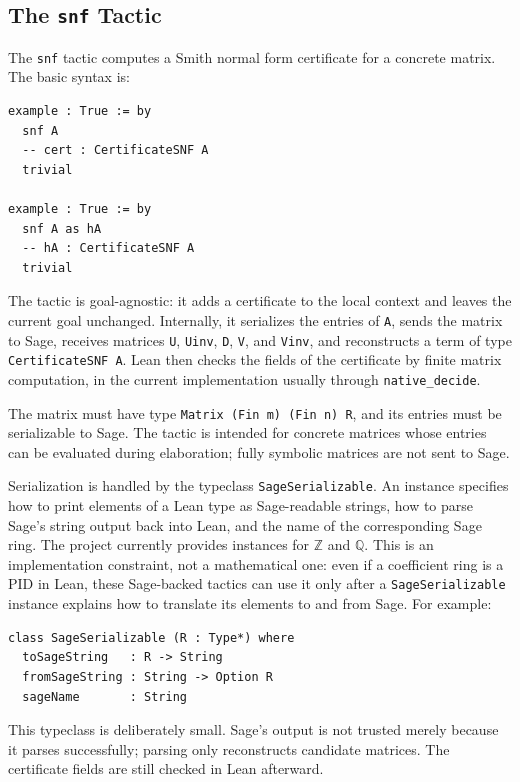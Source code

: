 \documentclass[11pt]{article}
\theoremstyle{plain}
\theoremstyle{definition}
\theoremstyle{remark}
\newcommand{\lean}[1]{\lstinline[language=lean]|#1|}
\begin{document}
\subsection{The \texttt{snf} Tactic}

The \lean{snf} tactic computes a Smith normal form certificate for a concrete
matrix. The basic syntax is:

\begin{lstlisting}[caption={Using the \texttt{snf} tactic.},label={lst:snf-tactic}]
example : True := by
  snf A
  -- cert : CertificateSNF A
  trivial

example : True := by
  snf A as hA
  -- hA : CertificateSNF A
  trivial
\end{lstlisting}

The tactic is goal-agnostic: it adds a certificate to the local context and
leaves the current goal unchanged. Internally, it serializes the entries of
\lean{A}, sends the matrix to Sage, receives matrices \lean{U}, \lean{Uinv},
\lean{D}, \lean{V}, and \lean{Vinv}, and reconstructs a term of type
\lean{CertificateSNF A}. Lean then checks the fields of the certificate by
finite matrix computation, in the current implementation usually through
\lean{native_decide}.

The matrix must have type \lean{Matrix (Fin m) (Fin n) R}, and its entries must
be serializable to Sage. The tactic is intended for concrete matrices whose
entries can be evaluated during elaboration; fully symbolic matrices are not
sent to Sage.

Serialization is handled by the typeclass \lean{SageSerializable}. An instance
specifies how to print elements of a Lean type as Sage-readable strings, how to
parse Sage's string output back into Lean, and the name of the corresponding
Sage ring. The project currently provides instances for \(\mathbb{Z}\) and
\(\mathbb{Q}\). This is an implementation constraint, not a mathematical one:
even if a coefficient ring is a PID in Lean, these Sage-backed tactics can use
it only after a \lean{SageSerializable} instance explains how to translate its
elements to and from Sage. For example:

\begin{lstlisting}[caption={The serialization interface for coefficient rings.},label={lst:sage-serializable}]
class SageSerializable (R : Type*) where
  toSageString   : R -> String
  fromSageString : String -> Option R
  sageName       : String
\end{lstlisting}

This typeclass is deliberately small. Sage's output is not trusted merely
because it parses successfully; parsing only reconstructs candidate matrices.
The certificate fields are still checked in Lean afterward.
\end{document}
